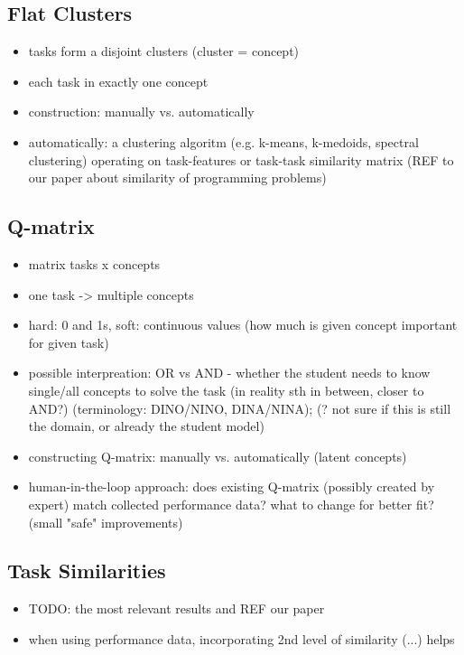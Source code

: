\subsection{Flat Clusters}

\begin{itemize}
\item tasks form a disjoint clusters (cluster = concept)
\item each task in exactly one concept
\item construction: manually vs. automatically
\item automatically: a clustering algoritm (e.g. k-means, k-medoids, spectral clustering) operating on task-features or task-task similarity matrix (REF to our paper about similarity of programming problems)
\end{itemize}


\subsection{Q-matrix}

\begin{itemize}
\item matrix tasks x concepts
\item one task -> multiple concepts
\item hard: 0 and 1s, soft: continuous values (how much is given concept important for given task)
\item possible interpreation: OR vs AND - whether the student needs to know single/all concepts to solve the task (in reality sth in between, closer to AND?) (terminology: DINO/NINO, DINA/NINA); (? not sure if this is still the domain, or already the student model)
\item constructing Q-matrix: manually vs. automatically (latent concepts)
\item human-in-the-loop approach: does existing Q-matrix (possibly created by expert) match collected performance data? what to change for better fit? (small "safe" improvements)
\end{itemize}


\subsection{Task Similarities}

\begin{itemize}
\item TODO: the most relevant results and REF our paper
\item when using performance data, incorporating 2nd level of similarity (...) helps \cite{rihak-phd}
\end{itemize}


